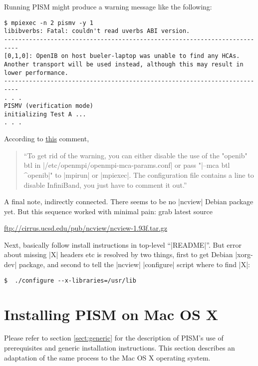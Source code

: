 \documentclass[11pt,final]{amsart}
\begin{document}
Running PISM might produce a warning message like the following:
\begin{verbatim}
$ mpiexec -n 2 pismv -y 1
libibverbs: Fatal: couldn't read uverbs ABI version.
--------------------------------------------------------------------------
[0,1,0]: OpenIB on host bueler-laptop was unable to find any HCAs.
Another transport will be used instead, although this may result in 
lower performance.
--------------------------------------------------------------------------
. . .
PISMV (verification mode)
initializing Test A ...
. . .
\end{verbatim}
According to \href{http://lists.alioth.debian.org/pipermail/pkg-openmpi-commits/2007-August/000044.html}{this} comment,
\begin{quote}
   ``To get rid of the warning, you can either disable the use of the "openib" btl
   in |/etc/openmpi/openmpi-mca-params.conf| or pass "|--mca btl ^openib|" to |mpirun|
   or |mpiexec|. The configuration file contains a line to disable InfiniBand, you
   just have to comment it out.''
\end{quote}
\bigskip

A final note, indirectly connected. There seems to be no |ncview| Debian package
yet.  But this sequence worked with minimal pain: grab latest source
\begin{center}
  \url{ftp://cirrus.ucsd.edu/pub/ncview/ncview-1.93f.tar.gz}
\end{center}
Next, basically follow install instructions in top-level ``|README|''. But error about missing |X| headers etc is resolved by two
things, first to get Debian |xorg-dev| package, and second to tell the |ncview| |configure| script where to find |X|:
\begin{verbatim}
$  ./configure --x-libraries=/usr/lib
\end{verbatim}


\clearpage
\section{Installing PISM on Mac OS X}
\label{sec:macosx}

Please refer to section \ref{sect:generic} for the description of PISM's use of prerequisites and generic installation
instructions. This section describes an adaptation of the same process to the Mac OS X operating system.
\end{document}
